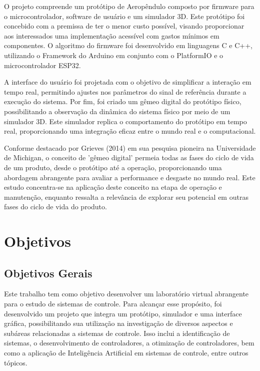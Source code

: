 O projeto compreende um protótipo de Aeropêndulo composto por firmware para o microcontrolador, software de usuário e um simulador 3D. Este protótipo foi concebido com a premissa de ter o menor custo possível, visando proporcionar aos interessados uma implementação acessível com gastos mínimos em componentes. O algoritmo do firmware foi desenvolvido em linguagens C e C++, utilizando o Framework do Arduino em conjunto com o PlatformIO e o microcontrolador ESP32.

A interface do usuário foi projetada com o objetivo de simplificar a interação em tempo real, permitindo ajustes nos parâmetros do sinal de referência durante a execução do sistema. Por fim, foi criado um gêmeo digital do protótipo físico, possibilitando a observação da dinâmica do sistema físico por meio de um simulador 3D. Este simulador replica o comportamento do protótipo em tempo real, proporcionando uma integração eficaz entre o mundo real e o computacional.

Conforme destacado por Grieves (2014) em sua pesquisa pioneira na Universidade de Michigan, o conceito de 'gêmeo digital' permeia todas as fases do ciclo de vida de um produto, desde o protótipo até a operação, proporcionando uma abordagem abrangente para avaliar a performance e desgaste no mundo real. Este estudo concentra-se na aplicação deste conceito na etapa de operação e manutenção, enquanto ressalta a relevância de explorar seu potencial em outras fases do ciclo de vida do produto\cite{quinalha2018gemeos}.


\section{Objetivos}

\subsection{Objetivos Gerais}

Este trabalho tem como objetivo desenvolver um laboratório virtual abrangente para o estudo de sistemas de controle. Para alcançar esse propósito, foi desenvolvido um projeto que integra um protótipo, simulador e uma interface gráfica, possibilitando sua utilização na investigação de diversos aspectos e subáreas relacionadas a sistemas de controle. Isso inclui a identificação de sistemas, o desenvolvimento de controladores, a otimização de controladores, bem como a aplicação de Inteligência Artificial em sistemas de controle, entre outros tópicos.

